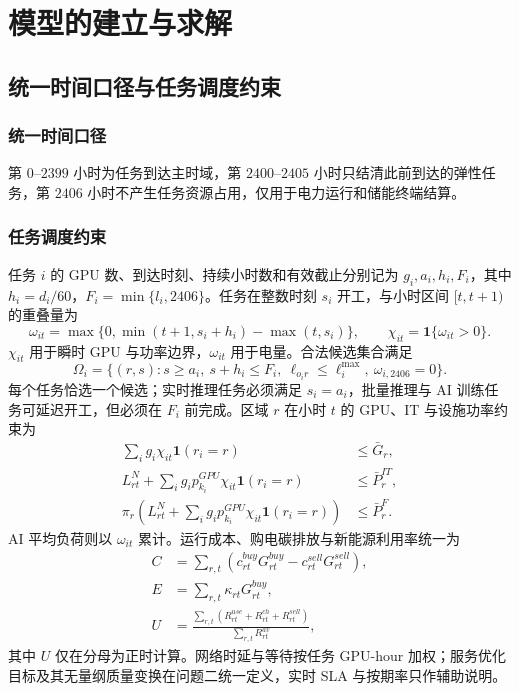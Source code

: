 \documentclass[withoutpreface,bwprint]{cumcmthesis}
\begin{document}
\section{模型的建立与求解}

\subsection{统一时间口径与任务调度约束}
\subsubsection{统一时间口径}
第 $0$--$2399$ 小时为任务到达主时域，第 $2400$--$2405$ 小时只结清此前到达的弹性任务，第 $2406$ 小时不产生任务资源占用，仅用于电力运行和储能终端结算。

\subsubsection{任务调度约束}
任务 $i$ 的 GPU 数、到达时刻、持续小时数和有效截止分别记为 $g_i,a_i,h_i,F_i$，其中 $h_i=d_i/60$，$F_i=\min\{l_i,2406\}$。任务在整数时刻 $s_i$ 开工，与小时区间 $[t,t+1)$ 的重叠量为
\begin{equation}
\omega_{it}=\max\{0,\min(t+1,s_i+h_i)-\max(t,s_i)\},\qquad
\chi_{it}=\mathbf 1\{\omega_{it}>0\}.
\end{equation}
$\chi_{it}$ 用于瞬时 GPU 与功率边界，$\omega_{it}$ 用于电量。合法候选集合满足
\begin{equation}
\Omega_i=\{(r,s):s\ge a_i,\ s+h_i\le F_i,\ \ell_{o_i r}\le \ell_i^{\max},\ \omega_{i,2406}=0\}.
\end{equation}
每个任务恰选一个候选；实时推理任务必须满足 $s_i=a_i$，批量推理与 AI 训练任务可延迟开工，但必须在 $F_i$ 前完成。区域 $r$ 在小时 $t$ 的 GPU、IT 与设施功率约束为
\begin{align}
\sum_i g_i\chi_{it}\mathbf 1(r_i=r)&\le \bar G_r,\\
L_{rt}^{N}+\sum_i g_i p_{k_i}^{GPU}\chi_{it}\mathbf 1(r_i=r)&\le \bar P_r^{IT},\\
\pi_r\!\left(L_{rt}^{N}+\sum_i g_i p_{k_i}^{GPU}\chi_{it}\mathbf 1(r_i=r)\right)&\le \bar P_r^{F}.
\end{align}
AI 平均负荷则以 $\omega_{it}$ 累计。运行成本、购电碳排放与新能源利用率统一为
\begin{align}
C&=\sum_{r,t}(c^{buy}_{rt}G^{buy}_{rt}-c^{sell}_{rt}G^{sell}_{rt}),\\
E&=\sum_{r,t}\kappa_{rt}G^{buy}_{rt},\\
U&=\frac{\sum_{r,t}(R^{use}_{rt}+R^{ch}_{rt}+R^{sell}_{rt})}{\sum_{r,t}R^{av}_{rt}},
\end{align}
其中 $U$ 仅在分母为正时计算。网络时延与等待按任务 GPU-hour 加权；服务优化目标及其无量纲质量变换在问题二统一定义，实时 SLA 与按期率只作辅助说明。
\end{document}
